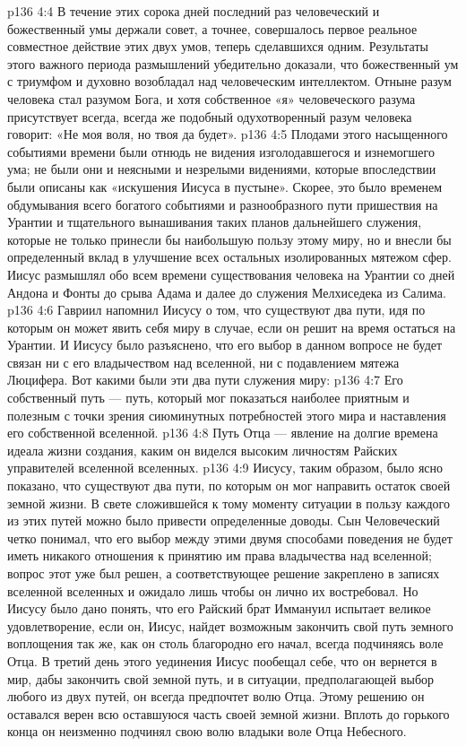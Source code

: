 \vs p136 4:4 \pc В течение этих сорока дней последний раз человеческий и божественный умы держали совет, а точнее, совершалось первое реальное совместное действие этих двух умов, теперь сделавшихся одним. Результаты этого важного периода размышлений убедительно доказали, что божественный ум с триумфом и духовно возобладал над человеческим интеллектом. Отныне разум человека стал разумом Бога, и хотя собственное «я» человеческого разума присутствует всегда, всегда же подобный одухотворенный разум человека говорит: «Не моя воля, но твоя да будет».
\vs p136 4:5 Плодами этого насыщенного событиями времени были отнюдь не видения изголодавшегося и изнемогшего ума; не были они и неясными и незрелыми видениями, которые впоследствии были описаны как «искушения Иисуса в пустыне». Скорее, это было временем обдумывания всего богатого событиями и разнообразного пути пришествия на Урантии и тщательного вынашивания таких планов дальнейшего служения, которые не только принесли бы наибольшую пользу этому миру, но и внесли бы определенный вклад в улучшение всех остальных изолированных мятежом сфер. Иисус размышлял обо всем времени существования человека на Урантии со дней Андона и Фонты до срыва Адама и далее до служения Мелхиседека из Салима.
\vs p136 4:6 Гавриил напомнил Иисусу о том, что существуют два пути, идя по которым он может явить себя миру в случае, если он решит на время остаться на Урантии. И Иисусу было разъяснено, что его выбор в данном вопросе не будет связан ни с его владычеством над вселенной, ни с подавлением мятежа Люцифера. Вот какими были эти два пути служения миру:
\vs p136 4:7 \pc {}\bibnobreakspace Его собственный путь --- путь, который мог показаться наиболее приятным и полезным с точки зрения сиюминутных потребностей этого мира и наставления его собственной вселенной.
\vs p136 4:8 \bibnobreakspace Путь Отца --- явление на долгие времена идеала жизни создания, каким он виделся высоким личностям Райских управителей вселенной вселенных.
\vs p136 4:9 Иисусу, таким образом, было ясно показано, что существуют два пути, по которым он мог направить остаток своей земной жизни. В свете сложившейся к тому моменту ситуации в пользу каждого из этих путей можно было привести определенные доводы. Сын Человеческий четко понимал, что его выбор между этими двумя способами поведения не будет иметь никакого отношения к принятию им права владычества над вселенной; вопрос этот уже был решен, а соответствующее решение закреплено в записях вселенной вселенных и ожидало лишь чтобы он лично их востребовал. Но Иисусу было дано понять, что его Райский брат Иммануил испытает великое удовлетворение, если он, Иисус, найдет возможным закончить свой путь земного воплощения так же, как он столь благородно его начал, всегда подчиняясь воле Отца. В третий день этого уединения Иисус пообещал себе, что он вернется в мир, дабы закончить свой земной путь, и в ситуации, предполагающей выбор любого из двух путей, он всегда предпочтет волю Отца. Этому решению он оставался верен всю оставшуюся часть своей земной жизни. Вплоть до горького конца он неизменно подчинял свою волю владыки воле Отца Небесного.
